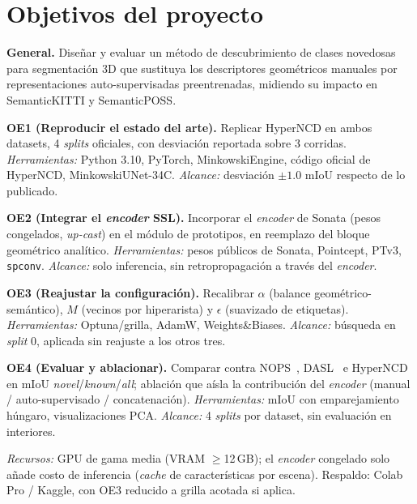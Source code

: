 \documentclass[9.5pt,twocolumn,a4paper]{article}
\begin{document}
\section{Objetivos del proyecto}
\textbf{General.} Diseñar y evaluar un método de descubrimiento de clases
novedosas para segmentación 3D que sustituya los descriptores geométricos
manuales por representaciones auto-supervisadas preentrenadas, midiendo su
impacto en SemanticKITTI y SemanticPOSS.

\textbf{OE1 (Reproducir el estado del arte).} Replicar HyperNCD en ambos
datasets, 4 \emph{splits} oficiales, con desviación reportada sobre 3
corridas. \emph{Herramientas:} Python 3.10, PyTorch, MinkowskiEngine, código
oficial de HyperNCD, MinkowskiUNet-34C. \emph{Alcance:} desviación
$\pm1.0$ mIoU respecto de lo publicado.

\textbf{OE2 (Integrar el \emph{encoder} SSL).} Incorporar el \emph{encoder}
de Sonata (pesos congelados, \emph{up-cast}) en el módulo de prototipos, en
reemplazo del bloque geométrico analítico. \emph{Herramientas:} pesos
públicos de Sonata, Pointcept, PTv3, \texttt{spconv}. \emph{Alcance:} solo
inferencia, sin retropropagación a través del \emph{encoder}.

\textbf{OE3 (Reajustar la configuración).} Recalibrar $\alpha$ (balance
geométrico-semántico), $M$ (vecinos por hiperarista) y $\epsilon$ (suavizado
de etiquetas). \emph{Herramientas:} Optuna/grilla, AdamW, Weights\&Biases.
\emph{Alcance:} búsqueda en \emph{split} 0, aplicada sin reajuste a los otros
tres.

\textbf{OE4 (Evaluar y ablacionar).} Comparar contra NOPS~\cite{nops},
DASL~\cite{dasl} e HyperNCD en mIoU \emph{novel}/\emph{known}/\emph{all};
ablación que aísla la contribución del \emph{encoder} (manual /
auto-supervisado / concatenación). \emph{Herramientas:} mIoU con
emparejamiento húngaro, visualizaciones PCA. \emph{Alcance:} 4 \emph{splits}
por dataset, sin evaluación en interiores.

\emph{Recursos:} GPU de gama media (VRAM $\geq$12\,GB); el \emph{encoder}
congelado solo añade costo de inferencia (\emph{cache} de características por
escena). Respaldo: Colab Pro / Kaggle, con OE3 reducido a grilla acotada si
aplica.
\end{document}
